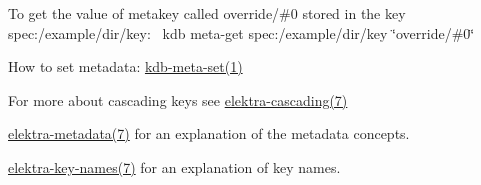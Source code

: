 To get the value of metakey called {\ttfamily override/\#0} stored in the key {\ttfamily spec\+:/example/dir/key}\+:~\newline
 {\ttfamily kdb meta-\/get spec\+:/example/dir/key \char`\"{}override/\#0\char`\"{}}


\begin{DoxyItemize}
\item How to set metadata\+: \hyperlink{doc_help_kdb-meta-set_md}{kdb-\/meta-\/set(1)}
\item For more about cascading keys see \hyperlink{doc_help_elektra-cascading_md}{elektra-\/cascading(7)}
\item \hyperlink{doc_help_elektra-metadata_md}{elektra-\/metadata(7)} for an explanation of the metadata concepts.
\item \hyperlink{doc_help_elektra-key-names_md}{elektra-\/key-\/names(7)} for an explanation of key names. 
\end{DoxyItemize}